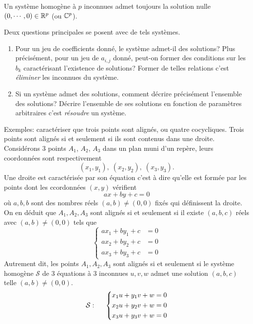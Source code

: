 \begin{rem}
 Un système homogène à $p$ inconnues admet toujours la solution nulle $(0,\cdots,0)\in\mathbb{R}^p$ (ou $\mathbb{C}^p$).
\end{rem}

Deux questions principales se posent avec de tels systèmes.
\begin{enumerate}
 \item Pour un jeu de coefficients donné, le système admet-il des solutions? Plus précisément, pour un jeu de $a_{i,j}$ donné, peut-on former des conditions sur les $b_k$ caractérisant l'existence de solutions? Former de telles relations c'est \emph{éliminer}  les inconnues du système.
 \item Si un système admet des solutions, comment décrire précisément l'ensemble des solutions?  Décrire l'ensemble de ses solutions en fonction de paramètres arbitraires c'est \emph{résoudre} un système.
\end{enumerate}
Exemples: caractériser que trois points sont alignés, ou quatre cocycliques.\newline
Trois points sont alignés si et seulement si ils sont contenus dans une droite. Considérons 3 points $A_1$, $A_2$, $A_3$ dans un plan muni d'un repère, leurs coordonnées sont respectivement
\[
 (x_1,y_1),\; (x_2,y_2),\; (x_3,y_3).
\]
Une droite est caractérisée par son équation c'est à dire qu'elle est formée par les points dont les ccordonnées $(x,y)$ vérifient
\[
 ax + by + c = 0 
\]
où $a, b, b$ sont des nombres réels $(a,b)\neq (0,0)$ fixés qui définissent la droite.\newline
On en déduit que $A_1, A_2, A_3$ sont alignés si et seulement si il existe $(a,b,c)$ réels avec $(a,b)\neq (0,0)$ tels que 
\[
 \left\lbrace
 \begin{aligned}
a x_1 + by_1 + c &= 0\\ a x_2 + by_2 + c &= 0\\ a x_3 + by_3 + c &= 0  
 \end{aligned}
\right.
\]
Autrement dit, les points $A_1,A_2,A_3$ sont alignés si et seulement si le système homogène $\mathcal{S}$ de 3 équations à 3 inconnues $u,v, w$ admet une solution $(a,b,c)$ telle $(a,b)\neq(0,0)$.
\[
 \mathcal{S}: \hspace{0.5cm}
 \left\lbrace
 \begin{aligned}
x_1u + y_1v + w &= 0\\ x_2u + y_2v + w &= 0\\ x_3u + y_3v + w &= 0  
 \end{aligned}
\right.
\]

